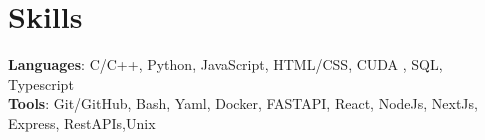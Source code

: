 
\section{Skills}
 \begin{itemize}[leftmargin=0.15in, label={}]
    \small{\item{
    
     \textbf{Languages}{: C/C++, Python, JavaScript, HTML/CSS, CUDA , SQL, Typescript} \\
     
     \textbf{Tools}{: Git/GitHub, Bash, Yaml, Docker, FASTAPI, React, NodeJs, NextJs, Express, RestAPIs,Unix}
    }}
 \end{itemize}


